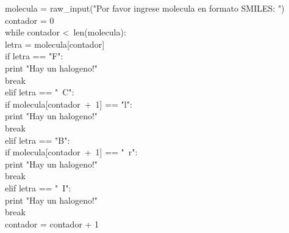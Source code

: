 \documentclass[10pt,letterpaper]{article}
\newenvironment{Code}
{
\begin{lrbox}{\selvestebox}%
\begin{minipage}{\dimexpr\columnwidth-2\fboxsep\relax}
\fontfamily{\ttdefault}\selectfont
}
{\end{minipage}\end{lrbox}%
\begin{center}
\colorbox{light-gray}{\usebox{\selvestebox}}
\end{center}
}
\begin{document}
\begin{Code}
molecula = raw\_input("Por favor ingrese molecula en formato SMILES: ")\\
contador = 0\\
while contador <\ len(molecula):\\
\hspace*{5mm} letra = molecula[contador]\\
\hspace*{5mm} if letra == "F":\\
\hspace*{13mm} print "Hay un halogeno!"\\
\hspace*{13mm} break\\
\hspace*{5mm} elif letra == "\ \hspace*{-2mm}C":\\
\hspace*{13mm} if molecula[contador\ +\ 1] == "l":\\
\hspace*{21mm} print "Hay un halogeno!"\\
\hspace*{21mm} break\\
\hspace*{5mm} elif letra == "B":\\
\hspace*{13mm} if molecula[contador\ +\ 1] == "\ \hspace*{-2mm}r":\\
\hspace*{21mm} print "Hay un halogeno!"\\
\hspace*{21mm} break\\
\hspace*{5mm} elif letra == "\ \hspace*{-2mm}I":\\
\hspace*{13mm} print "Hay un halogeno!"\\
\hspace*{13mm} break\\
\hspace*{5mm} contador = contador + 1
\end{Code}
\end{document}
